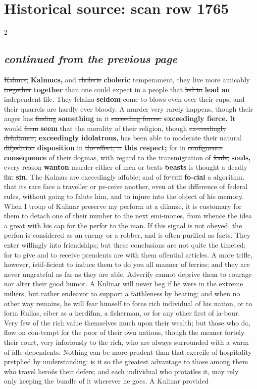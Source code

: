 \documentclass[10pt]{article}
\begin{document}
\section*{Historical source: scan row 1765}
\begin{multicols}{2}
\subsection*{\textit{continued from the previous page}}
\sout{Kalmcs,} \textbf{Kalmucs,} and \sout{cholerie} \textbf{choleric} temperament, they live more amicably \sout{to-gether} \textbf{together} than one could expect in a people that \sout{led to} \textbf{lead an} independent life. They \sout{felaina} \textbf{seldom} come to blows even over their cups, and their quarrels are hardly ever bloody. A murder very rarely happens, though their anger has \sout{finding} \textbf{something} in it \sout{exceeding forces.} \textbf{exceedingly fierce.} It would \sout{feem} \textbf{seem} that the morality of their religion, though \sout{ex-ceedingly delaltance,} \textbf{exceedingly idolatrous,} has been able to moderate their natural \sout{difjedition} \textbf{disposition} in \sout{the effect; it} \textbf{this respect;} for in \sout{confignence} \textbf{consequence} of their dogmas, with regard to the transmigration of \sout{fouls,} \textbf{souls,} every \sout{reason} \textbf{wanton} murder either of men or \sout{beats} \textbf{beasts} is thought a deadly \sout{fin.} \textbf{sin.} The Kalmus are exceedingly affable; and of \sout{fo-cali} \textbf{fo-cial} a algorithm, that its rare face a traveller or pe-ceive another, even at the difference of federal rules, without going to falute him, and to injure into the object of his memory. When I troup of Kulinar preserve my perform at a dilanze, it is customary for them to detach one of their number to the next emi-mones, from whence the idea a great with his cap for the perfor to the man. If this signal is not obeyed, the perfon is considered as an enemy or a robber, and is often purified as facts. They enter willingly into friendships; but these conclusions are not quite the timeted; for to give and to receive prendents are with them offential articles. A more trifle, however, istif-ficient to induce them to do you all manner of ferries; and they are never ungrateful as far as they are able. Adverify cannot deprive them to courage nor alter their good humor. A Kulinar will never beg if he were in the extreme miliers, but rather endeavor to support a faithleness by beating; and when no other way remains, he will fear himself to force rich individual of his nation, or to form Rullas, ciber as a herdifnn, a fisherman, or for any other first of la-bour. Very few of the rich value themselves much upon their wealth; but those who do, flow on con-tempt for the poor of their own nations, though the meaner fortely their court, very inforiously to the rich, who are always surrounded with a warm of idle dependents. Nothing can be more prudent than that exercife of hospitality pretplied by understanding: is it so the greatest advantage to those among them who travel heroés their defers; and each individual who protatles it, may rely only keeping the bundle of it wherever he goes. A Kulinar provided 
\end{multicols}
\end{document}
